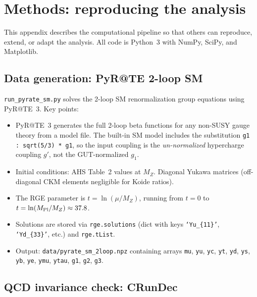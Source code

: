 \documentclass[11pt,a4paper]{article}
\newcommand{\MZ}{M_Z}
\newcommand{\MPl}{M_{\rm Pl}}
\begin{document}
\appendix

\section{Methods: reproducing the analysis}
\label{app:methods}

This appendix describes the computational pipeline so that others
can reproduce, extend, or adapt the analysis. All code is Python~3
with NumPy, SciPy, and Matplotlib.

\subsection{Data generation: PyR@TE 2-loop SM}

\texttt{run\_pyrate\_sm.py} solves the 2-loop SM renormalization group
equations using PyR@TE~3. Key points:

\begin{itemize}
\item PyR@TE~3 generates the full 2-loop beta functions for any
  non-SUSY gauge theory from a model file. The built-in SM model
  includes the substitution \texttt{g1 : sqrt(5/3) * g1}, so the
  input coupling is the \emph{un-normalized} hypercharge coupling $g'$,
  not the GUT-normalized $g_1$.
\item Initial conditions: AHS Table~2 values at $\MZ$. Diagonal Yukawa
  matrices (off-diagonal CKM elements negligible for Koide ratios).
\item The RGE parameter is $t = \ln(\mu/\MZ)$, running from $t = 0$
  to $t = \ln(\MPl/\MZ) \approx 37.8$.
\item Solutions are stored via \texttt{rge.solutions} (dict with keys
  \texttt{`Yu\_\{11\}'}, \texttt{`Yd\_\{33\}'}, etc.) and \texttt{rge.tList}.
\item Output: \texttt{data/pyrate\_sm\_2loop.npz} containing arrays
  \texttt{mu}, \texttt{yu}, \texttt{yc}, \texttt{yt}, \texttt{yd},
  \texttt{ys}, \texttt{yb}, \texttt{ye}, \texttt{ymu}, \texttt{ytau},
  \texttt{g1}, \texttt{g2}, \texttt{g3}.
\end{itemize}

\subsection{QCD invariance check: CRunDec}
\end{document}

